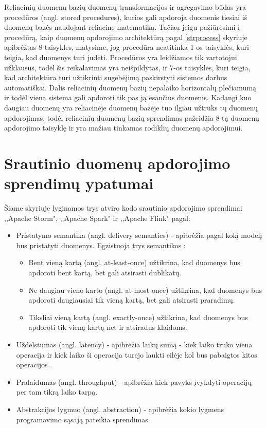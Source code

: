 \documentclass{VUMIFPSkursinis}
\begin{document}
        Reliacinių duomenų bazių duomenų transformacijos ir agregavimo būdas yra procedūros (angl. stored procedures), kurios gali apdoroja duomenis tiesiai iš duomenų bazės 
    naudojant reliacinę matematiką. Tačiau jeigu pažiūrėsimi į procedūrą, kaip duomenų apdorojimo architektūrą pagal \ref{strprocess} skyriuje apibrėžtas 8 taisykles, 
    matysime, jog procedūra neatitinka 1-os taisyklės, kuri teigia, kad duomenys turi judėti. Procedūros yra leidžiamos tik vartotojui užklausus, todėl šis reikalavimas yra neišpildytas, 
    ir 7-os taisyklės, kuri teigia, kad architektūra turi užtikrinti sugebėjimą paskirstyti sistemos darbus automatiškai. Dalis reliacinių duomenų bazių nepalaiko horizontalų 
    plečiamumą \cite{cattelsql, jkubas} ir todėl viena sistema gali apdoroti tik pas ją esančius duomenis. Kadangi kuo daugiau duomenų yra reliacinėje duomenų bazėje 
    tuo ilgiau užtrūks tų duomenų apdorojimas, todėl reliacinių duomenų bazių sprendimas pažeidžia 8-tą duomenų 
    apdorojimo taisyklę ir yra mažiau tinkamas rodiklių duomenų apdorojimui.


\section{Srautinio duomenų apdorojimo sprendimų ypatumai} \label{srautarch}
Šiame skyriuje lyginamos trys atviro kodo srautinio apdorojimo sprendimai ,,Apache Storm", ,,Apache Spark" ir ,,Apache Flink" pagal:
\begin{itemize}
    \item Pristatymo semantika (angl. delivery semantics) - apibrėžia pagal kokį modelį bus pristatyti duomenys. Egzistuoja trys semantikos \cite{ensar20}: 
    \begin{itemize}
        \item Bent vieną kartą (angl. at-least-once) užtikrina, kad duomenys bus apdoroti bent kartą, bet gali atsirasti dublikatų. 
        \item Ne daugiau vieno karto (angl. at-most-once) užtikrina, kad duomenys bus apdoroti daugiausiai tik vieną kartą, bet gali atsirasti praradimų. 
        \item Tiksliai vieną kartą (angl. exactly-once) užtikrina, kad duomenys bus apdoroti tik vieną kartą net ir atsiradus klaidoms.
    \end{itemize}
    \item Uždelstumas (angl. latency) - apibrėžia laikų sumą - kiek laiko trūko viena operacija ir kiek laiko ši operacija turėjo laukti eilėje
    kol bus pabaigtos kitos operacijos \cite{karimov2018benchmarking}.
    \item Pralaidumas (angl. throughput) - apibrėžia kiek pavyks įvykdyti operacijų per tam tikrą laiko tarpą.
    \item Abstrakcijos lygmuo (angl. abstraction) - apibrėžia kokio lygmens programavimo sąsają pateikia sprendimas.
\end{itemize}
\end{document}
